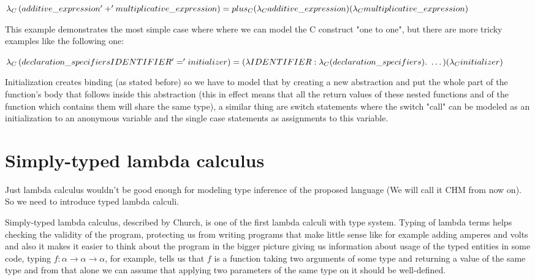 $\lambda_C\left(additive\_expression '+' multiplicative\_expression\right) = \\ plus_C (\lambda_C additive\_expression) (\lambda_C multiplicative\_expression)$

This example demonstrates the most simple case where  where we can model the C construct "one to one",
but there are more tricky examples like the following one:

$\lambda_C\left(declaration\_specifiers IDENTIFIER '=' initializer\right) = \\ (\lambda IDENTIFIER : \lambda_C(declaration\_specifiers) .\ \dots) (\lambda_C initializer)$

Initialization creates binding (as stated before) so we have to model that by creating a new abstraction and put the whole
part of the function's body that follows inside this abstraction (this in effect means that all the return values of these nested functions
and of the function which contains them will share the same type), a similar thing are switch statements where the switch "call" can be modeled
as an initialization to an anonymous variable and the single case statements as assignments to this variable.

\section{Simply-typed lambda calculus}

Just lambda calculus wouldn't be good enough for modeling type inference of the proposed language (We will call it CHM from now on).
So we need to introduce typed lambda calculi.

Simply-typed lambda calculus, described by Church, is one of the first %
lambda calculi with type system. Typing of lambda terms helps checking the validity of the program, protecting us from writing
programs that make little sense like for example adding amperes and volts %
and also it makes it easier to think about the program in the bigger picture giving us information about usage of the typed entities
in some code, typing $f : \alpha \rightarrow \alpha \rightarrow \alpha$, for example, tells us that $f$ is a function taking two arguments
of some type and returning a value of the same type and from that alone we can assume that applying two parameters of the same type on it
should be well-defined.

